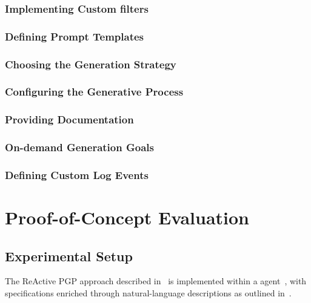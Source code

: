 \documentclass[12pt,a4paper,openright,twoside]{book}
\begin{document}
\subsection{Implementing Custom filters}

\subsection{Defining Prompt Templates}

\subsection{Choosing the Generation Strategy}

\subsection{Configuring the Generative Process}

\subsection{Providing Documentation}

\subsection{On-demand Generation Goals}

\subsection{Defining Custom Log Events}

\chapter{Proof-of-Concept Evaluation}\label{sec:evaluation}

\section{Experimental Setup}

The \ac{ReAct}ive \ac{PGP} approach described in~ is implemented within a \jakta{} agent~\cite{JaktaSNCS2024}, with specifications enriched through natural-language descriptions as outlined in~. 
\end{document}
